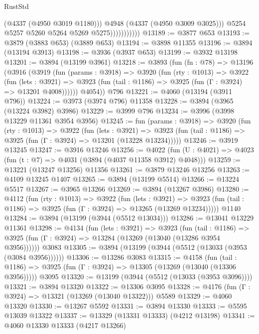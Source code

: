 \begin{lexlean}{RustStd}
\begin{coremodule}
                              (@4337 (@4950 @3019 @1180)))
                            @4948
                            (@4337 (@4950 @3009 @3025)))
                          @5254
                          @5257
                          @5260
                          @5264
                          @5269
                          @5275)))))))))))
@13189 := @3877 @653
@13193 := @3879 (@3883 @653) (@3889 @653)
@13194 := @3898 @11355
@13196 := @3894 (@13194 @3913)
@13198 := @3936 (@3937 @653)
@13199 := @3932 @13198
@13201 := @3894 (@13199 @3961)
@13218 := @3893
    (fun (fn : @78) =>
    @13196
      (@3916
        (@3919
          (fun (params : @3918) =>
          @3920
            (fun (rty : @1013) =>
            @3922
              (fun (lets : @3921) =>
              @3923 (fun (tail : @1186) => @3925 (fun (Γ : @3924) => @13201 @4008))))))
        @4054))
    @796
@13221 := @4060 (@13194 (@3911 @796))
@13224 := @3973 (@3974 @796) @11358
@13228 := @3894 (@3965 (@13224 @3982) @3986)
@13229 := @3999 @796
@13234 := @3996 (@3998 @13229 @11361 @3954 @3956)
@13245 := fun (params : @3918) =>
  @3920
    (fun (rty : @1013) =>
    @3922
      (fun (lets : @3921) =>
      @3923 (fun (tail : @1186) => @3925 (fun (Γ : @3924) => @13201 (@13228 @13234)))))
@13246 := @3919 @13245
@13247 := @3916 @13246
@13256 := @4022
    (fun (U : @4021) => @4023 (fun (t : @7) => @4031 (@3894 (@4037 @11358 @3912) @4048)))
@13259 := @13221 (@13247 @13256) @11356
@13261 := @3879 @13246 @13256
@13263 := @4109 @13245 @1407
@13265 := @3894 (@13199 @5514)
@13266 := @13224 @5517
@13267 := @3965 @13266
@13269 := @3894 (@13267 @3986)
@13280 := @4112
    (fun (rty : @1013) =>
    @3922
      (fun (lets : @3921) =>
      @3923 (fun (tail : @1186) => @3925 (fun (Γ : @3924) => @13265 (@13269 @13234)))))
    @1140
@13284 := @3894 (@13199 (@3944 (@5512 @13034)))
@13286 := @13041 @13229 @11361
@13298 := @4134
    (fun (lets : @3921) =>
    @3923
      (fun (tail : @1186) =>
      @3925 (fun (Γ : @3924) => @13284 (@13269 (@13040 (@13286 @3954 @3956))))))
    @3083
@13305 := @3894 (@13199 (@3944 (@5512 (@13033 (@3953 (@3084 @3956))))))
@13306 := @13286 @3083
@13315 := @4158
    (fun (tail : @1186) => @3925 (fun (Γ : @3924) => @13305 (@13269 (@13040 (@13306 @3956)))))
    @3095
@13320 := @13199 (@3944 (@5512 (@13033 (@3953 @3096))))
@13321 := @3894 @13320
@13322 := @13306 @3095
@13328 := @4176 (fun (Γ : @3924) => @13321 (@13269 (@13040 @13322))) @5589
@13329 := @4060 @13320
@13330 := @13267 @5592
@13331 := @3894 @13330
@13333 := @5595 @13039 @13322
@13337 := @13329 (@13331 @13333) (@4212 @13198)
@13341 := @4060 @13330 @13333 (@4217 @13266)

\end{coremodule}
\end{lexlean}
